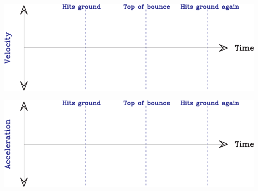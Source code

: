 \documentclass[12pt]{article}
\begin{document}
\begin{enumerate}
\begin{center}
	\vspace{0.4in}
	
	\includegraphics[width=\textwidth]{velocity-crop.pdf}
	
	\vspace{0.4in}
	
	\includegraphics[width=\textwidth]{acceleration-crop.pdf}
\end{center}






\end{enumerate}
\end{document}
